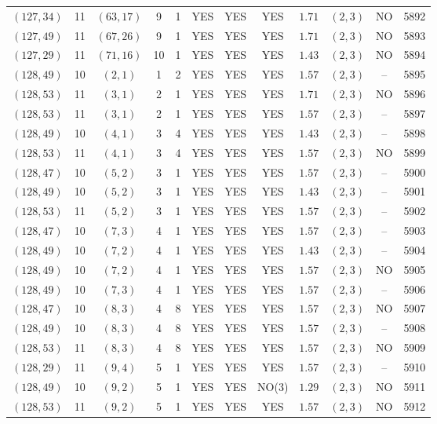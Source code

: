 \begin{longtable}{|c|c|c|c|c|c|c|c|c|c|c|c|}
$(127,34)$ & 11 & $(63,17)$ & 9 & 1 & YES & YES & YES & $1.71$ & $(2,3)$ & NO & 5892\\
$(127,49)$ & 11 & $(67,26)$ & 9 & 1 & YES & YES & YES & $1.71$ & $(2,3)$ & NO & 5893\\
$(127,29)$ & 11 & $(71,16)$ & 10 & 1 & YES & YES & YES & $1.43$ & $(2,3)$ & NO & 5894\\
$(128,49)$ & 10 & $(2,1)$ & 1 & 2 & YES & YES & YES & $1.57$ & $(2,3)$ & -- & 5895\\
$(128,53)$ & 11 & $(3,1)$ & 2 & 1 & YES & YES & YES & $1.71$ & $(2,3)$ & NO & 5896\\
$(128,53)$ & 11 & $(3,1)$ & 2 & 1 & YES & YES & YES & $1.57$ & $(2,3)$ & -- & 5897\\
$(128,49)$ & 10 & $(4,1)$ & 3 & 4 & YES & YES & YES & $1.43$ & $(2,3)$ & -- & 5898\\
$(128,53)$ & 11 & $(4,1)$ & 3 & 4 & YES & YES & YES & $1.57$ & $(2,3)$ & NO & 5899\\
$(128,47)$ & 10 & $(5,2)$ & 3 & 1 & YES & YES & YES & $1.57$ & $(2,3)$ & -- & 5900\\
$(128,49)$ & 10 & $(5,2)$ & 3 & 1 & YES & YES & YES & $1.43$ & $(2,3)$ & -- & 5901\\
$(128,53)$ & 11 & $(5,2)$ & 3 & 1 & YES & YES & YES & $1.57$ & $(2,3)$ & -- & 5902\\
$(128,47)$ & 10 & $(7,3)$ & 4 & 1 & YES & YES & YES & $1.57$ & $(2,3)$ & -- & 5903\\
$(128,49)$ & 10 & $(7,2)$ & 4 & 1 & YES & YES & YES & $1.43$ & $(2,3)$ & -- & 5904\\
$(128,49)$ & 10 & $(7,2)$ & 4 & 1 & YES & YES & YES & $1.57$ & $(2,3)$ & NO & 5905\\
$(128,49)$ & 10 & $(7,3)$ & 4 & 1 & YES & YES & YES & $1.57$ & $(2,3)$ & -- & 5906\\
$(128,47)$ & 10 & $(8,3)$ & 4 & 8 & YES & YES & YES & $1.57$ & $(2,3)$ & NO & 5907\\
$(128,49)$ & 10 & $(8,3)$ & 4 & 8 & YES & YES & YES & $1.57$ & $(2,3)$ & -- & 5908\\
$(128,53)$ & 11 & $(8,3)$ & 4 & 8 & YES & YES & YES & $1.57$ & $(2,3)$ & NO & 5909\\
$(128,29)$ & 11 & $(9,4)$ & 5 & 1 & YES & YES & YES & $1.57$ & $(2,3)$ & -- & 5910\\
$(128,49)$ & 10 & $(9,2)$ & 5 & 1 & YES & YES & NO(3) & $1.29$ & $(2,3)$ & NO & 5911\\
$(128,53)$ & 11 & $(9,2)$ & 5 & 1 & YES & YES & YES & $1.57$ & $(2,3)$ & NO & 5912\\

\end{longtable}
